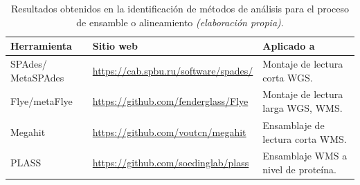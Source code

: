 \documentclass[12pt]{article}
\begin{document}
\begin{table}[htbp]
    \centering
    \caption{Resultados obtenidos en la identificación de métodos de análisis para el proceso de ensamble o alineamiento \emph{(elaboración propia)}.}
    \label{tabla:ensamble_alineamiento}
    \begin{tabularx}{\textwidth}{|p{3cm}|X|X|}
        \hline
        \textbf{Herramienta} & \textbf{Sitio web} & \textbf{Aplicado a} \\
        \hline
        SPAdes/
        MetaSPAdes & \href{https://cab.spbu.ru/software/spades/}{\url{https://cab.spbu.ru/software/spades/}} & Montaje de lectura corta WGS. \\
        \hline
        Flye/metaFlye & \href{https://github.com/fenderglass/Flye}{\url{https://github.com/fenderglass/Flye}} & Montaje de lectura larga WGS, WMS. \\
        \hline
        Megahit & \href{https://github.com/voutcn/megahit}{\url{https://github.com/voutcn/megahit}} & Ensamblaje de lectura corta WMS. \\
        \hline
        PLASS & \href{https://github.com/soedinglab/plass}{\url{https://github.com/soedinglab/plass}} & Ensamblaje WMS a nivel de proteína. \\
        \hline
    \end{tabularx}
\end{table}

\newpage
\end{document}
